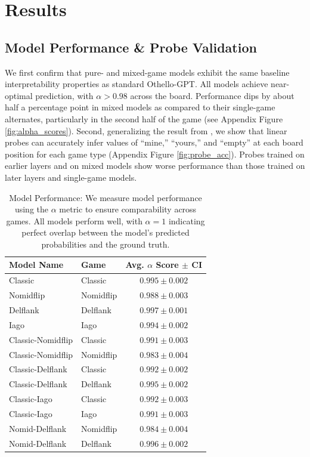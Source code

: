 \documentclass{article}
\theoremstyle{plain}
\theoremstyle{definition}
\theoremstyle{remark}
\begin{document}
\section{Results}

\subsection{Model Performance \& Probe Validation}
We first confirm that pure- and mixed-game models exhibit the same baseline interpretability properties as standard Othello-GPT. All models achieve near-optimal prediction, with $\alpha > 0.98$ across the board. Performance dips by about half a percentage point in mixed models as compared to their single-game alternates, particularly in the second half of the game (see Appendix Figure \ref{fig:alpha_scores}). Second, generalizing the result from \citealt{nanda_emergent_2023}, we show that linear probes can accurately infer values of ``mine,'' ``yours,'' and ``empty'' at each board position for each game type (Appendix Figure \ref{fig:probe_acc}). Probes trained on earlier layers and on mixed models show worse performance than those trained on later layers and single-game models.

\begin{table}
\centering
\small
\caption{Model Performance: We measure model performance using the $\alpha$ metric to ensure comparability across games. All models perform well, with $\alpha=1$ indicating perfect overlap between the model's predicted probabilities and the ground truth.}
\label{tab:alpha_scores}
\begin{tabular}{p{3cm} p{1.5cm} c}
\hline
\textbf{Model Name} & \textbf{Game} & \textbf{Avg. $\alpha$ Score $\pm$ CI} \\ \hline
Classic & Classic & $0.995 \pm 0.002$ \\
Nomidflip & Nomidflip & $0.988 \pm 0.003$ \\
Delflank & Delflank & $0.997 \pm 0.001$ \\
Iago & Iago & $0.994 \pm 0.002$ \\
Classic-Nomidflip & Classic & $0.991 \pm 0.003$ \\
Classic-Nomidflip & Nomidflip & $0.983 \pm 0.004$ \\
Classic-Delflank & Classic & $0.992 \pm 0.002$ \\
Classic-Delflank & Delflank & $0.995 \pm 0.002$ \\
Classic-Iago & Classic & $0.992 \pm 0.003$ \\
Classic-Iago & Iago & $0.991 \pm 0.003$ \\
Nomid-Delflank & Nomidflip & $0.984 \pm 0.004$ \\
Nomid-Delflank & Delflank & $0.996 \pm 0.002$ \\ \hline
\end{tabular}
\end{table}
\end{document}
